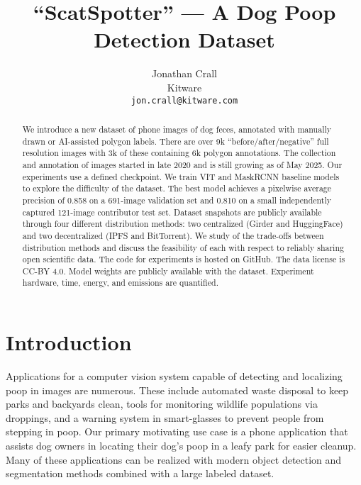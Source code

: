 \documentclass{article}
\title{``ScatSpotter'' --- A Dog Poop Detection Dataset}
\author{Jonathan Crall\\
Kitware\\
\texttt{jon.crall@kitware.com} \\
}
\begin{document}
\maketitle


\begin{abstract}


We introduce a new  dataset of phone images of dog feces, annotated with manually drawn or AI-assisted polygon labels. There are over 9k ``before/after/negative'' full resolution images with 3k of these containing 6k polygon annotations. The collection and annotation of images started in late 2020 and is still growing as of May 2025. Our experiments use a defined checkpoint.
We train VIT and MaskRCNN baseline models to explore the difficulty of the dataset.
The best model achieves a pixelwise average precision of 0.858 on a 691-image
validation set and 0.810 on a small independently captured 121-image contributor
test set.
Dataset snapshots are publicly available through four different distribution methods: two centralized (Girder and HuggingFace) and two decentralized (IPFS and BitTorrent).  
We study of the trade-offs between distribution methods and discuss the feasibility of each with respect to reliably sharing open scientific data.
The code for experiments is hosted on GitHub. The data license is 
CC-BY 4.0. Model weights are publicly available with the dataset. Experiment hardware, time, energy, and emissions are quantified.

\end{abstract}

\section{Introduction}
\label{sec:intro}

Applications for a computer vision system capable of detecting and localizing poop in images are numerous.
These include automated waste disposal to keep parks and backyards clean, tools for monitoring wildlife
  populations via droppings, and a warning system in smart-glasses to prevent people from stepping in poop.
Our primary motivating use case is a phone application that assists dog owners in locating their dog's poop
  in a leafy park for easier cleanup.
Many of these applications can be realized with modern object detection and segmentation methods
  \cite{sandler_mobilenetv2_2018, siam_rtseg_2018, yu_mobilenet_yolo_2023} combined with a large labeled
  dataset.
\end{document}
